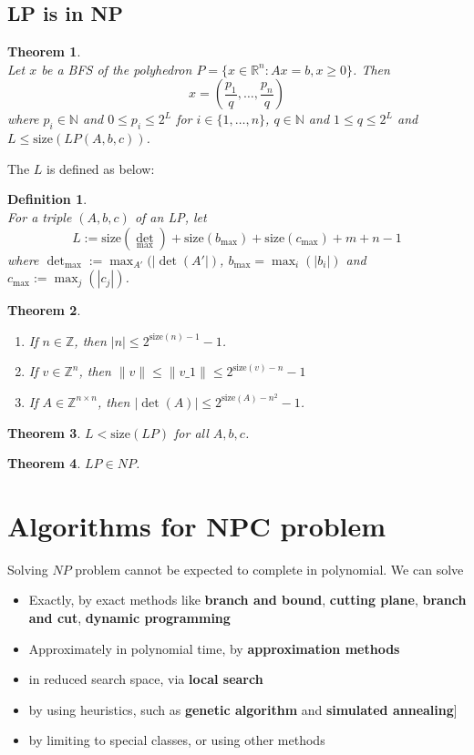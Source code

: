 \documentclass[12pt]{article}
\newtheorem{definition}{Definition}[section]
\newtheorem{theorem}{Theorem}[section]
\theoremstyle{definition}
\begin{document}
\subsection{LP is in NP}
\begin{theorem}
\hfill\\\normalfont Let $x$ be a BFS of the polyhedron $P=\{x\in\mathbb{R}^n : Ax=b, x\geq 0\}$. Then
\[
x=(\frac{p_1}{q},\ldots, \frac{p_n}{q})
\]
where $p_i\in\mathbb{N}$ and $0\leq p_i\leq 2^L$ for $i\in\{1,\ldots, n\}$, $q\in\mathbb{N}$ and $1\leq q\leq 2^L$ and $L\leq \text{size}(LP(A,b,c))$.
\end{theorem}
The $L$ is defined as below:
\begin{definition}
\hfill\\\normalfont For a triple $(A,b,c)$ of an LP, let
\[
L:=\text{size}(\det_{\max})+\text{size}(b_{\max})+\text{size}(c_{\max})+m+n-1
\]
where $\det_{\max}:=\max_{A'}(|\det(A'|)$, $b_{\max}=\max_{i}(|b_i|)$ and $c_{\max}:=\max_j(|c_j|)$.
\end{definition}
\begin{theorem}
\begin{enumerate}
  \item If $n\in \mathbb{Z}$, then $|n|\leq 2^{\text{size}(n)-1}-1$.
  \item If $v\in \mathbb{Z}^n$, then $\|v\|\leq \|v\_1\|\leq 2^{\text{size}(v)-n}-1$
  \item If $A\in\mathbb{Z}^{n\times n}$, then $|\det(A)|\leq 2^{\text{size}(A)-n^2}-1$.
\end{enumerate}
\end{theorem}
\begin{theorem}\normalfont $L<\text{size}(LP)$ for all $A,b,c$.
\end{theorem}
\begin{theorem}\normalfont $LP\in NP$.\end{theorem}
\clearpage
\section{Algorithms for NPC problem}
Solving $NP$ problem cannot be expected to complete in polynomial. We can solve 
\begin{itemize}
  \item Exactly, by exact methods like \textbf{branch and bound}, \textbf{cutting plane}, \textbf{branch and cut}, \textbf{dynamic programming}
  \item Approximately in polynomial time, by \textbf{approximation methods}
  \item in reduced search space, via \textbf{local search}
  \item by using heuristics, such as \textbf{genetic algorithm} and \textbf{simulated annealing}]
  \item by limiting to special classes, or using other methods
  \end{itemize}
\end{document}
